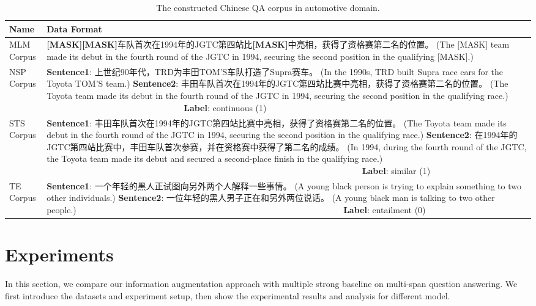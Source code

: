 \documentclass[mathematics,article,submit,moreauthors]{Definitions/mdpi}
\newcommand{\1}[1]{\mathds{1}\left[#1\right]}
\begin{document}
\begin{table}[H] 
	\caption{The constructed Chinese QA corpus in automotive domain.} \label{tab:annotated_corpus}
	\begin{tabularx}{\textwidth}{p{2cm}L} 
		\toprule
		\textbf{Name}  & \textbf{Data Format}	\\
		\midrule
		MLM Corpus  & \textbf{[MASK][MASK]}车队首次在1994年的JGTC第四站比\textbf{[MASK]}中亮相，获得了资格赛第二名的位置。{\color{blue} (The [MASK] team made its debut in the fourth round of the JGTC  in 1994, securing the second position in the qualifying [MASK].) } \\
		\midrule
		NSP Corpus  & \textbf{Sentence1}: 上世纪90年代，TRD为丰田TOM'S车队打造了Supra赛车。{\color{blue} (In the 1990s, TRD built Supra race cars for the Toyota TOM'S team.) }
		\textbf{Sentence2}: 丰田车队首次在1994年的JGTC第四站比赛中亮相，获得了资格赛第二名的位置。{\color{blue} (The Toyota team made its debut in the fourth round of the JGTC  in 1994, securing the second position in the qualifying race.)} ~~~~~~~~~~~~~~~~~~~~~~~~~~~~~~~~\textbf{Label}: continuous (1)\\
		\midrule
		STS Corpus & \textbf{Sentence1}: 丰田车队首次在1994年的JGTC第四站比赛中亮相，获得了资格赛第二名的位置。{\color{blue} (The Toyota team made its debut in the fourth round of the JGTC  in 1994, securing the second position in the qualifying race.)}
		\textbf{Sentence2}: 在1994年的JGTC第四站比赛中，丰田车队首次参赛，并在资格赛中获得了第二名的成绩。{\color{blue} (In 1994, during the fourth round of the JGTC, the Toyota team made its debut and secured a second-place finish in the qualifying race.)} ~~~~~~~~~~~~~~~~~~~~~~~~~~~~~~~~~~~~~~~~~~~~~~~~~~~~~~~~~~~~~~~~~~~~~~~~~ \textbf{Label}: similar (1) ~~~~~~~~		\\
		\midrule
		TE Corpus  &  \textbf{Sentence1}: 一个年轻的黑人正试图向另外两个人解释一些事情。{\color{blue} (A young black person is trying to explain something to two other individuals.)}
		\textbf{Sentence2}: 一位年轻的黑人男子正在和另外两位说话。{\color{blue} (A young black man is talking to two other people.)} ~~~~~~~~~~~~~~~~~~~~~~~~~~~~~~~~~~~~~~~~~~~~~~~~~~~~~~~~~~~~~ \textbf{Label}: entailment (0) ~~~~~		\\
		\bottomrule
	\end{tabularx}
\end{table}

\section{Experiments}
In this section, we compare our information augmentation approach with multiple strong baseline on multi-span question answering. We first introduce the datasets and experiment setup, then show the experimental results and analysis for different model.
\end{document}
